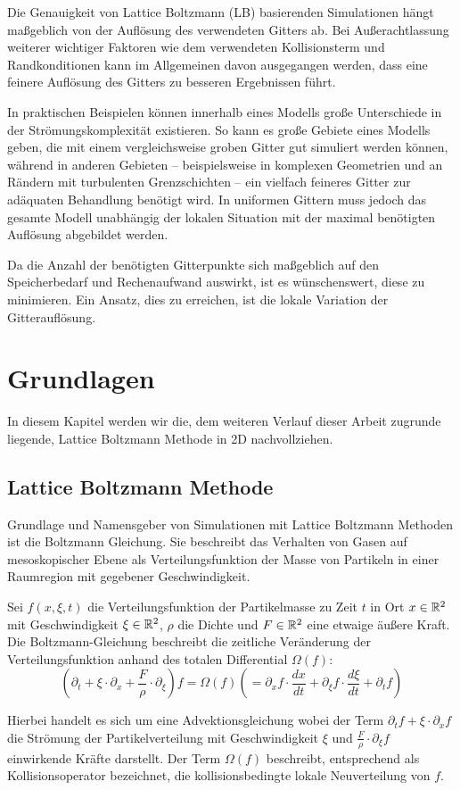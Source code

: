 Die Genauigkeit von Lattice Boltzmann (LB) basierenden Simulationen hängt maßgeblich von der Auflösung des verwendeten Gitters ab. Bei Außerachtlassung weiterer wichtiger Faktoren wie dem verwendeten Kollisionsterm und Randkonditionen kann im Allgemeinen davon ausgegangen werden, dass eine feinere Auflösung des Gitters zu besseren Ergebnissen führt.

In praktischen Beispielen können innerhalb eines Modells große Unterschiede in der Strömungskomplexität existieren. So kann es große Gebiete eines Modells geben, die mit einem vergleichsweise groben Gitter gut simuliert werden können, während in anderen Gebieten -- beispielsweise in komplexen Geometrien und an Rändern mit turbulenten Grenzschichten -- ein vielfach feineres Gitter zur adäquaten Behandlung benötigt wird. In uniformen Gittern muss jedoch das gesamte Modell unabhängig der lokalen Situation mit der maximal benötigten Auflösung abgebildet werden.

Da die Anzahl der benötigten Gitterpunkte sich maßgeblich auf den Speicherbedarf und Rechenaufwand auswirkt, ist es wünschenswert, diese zu minimieren. Ein Ansatz, dies zu erreichen, ist die lokale Variation der Gitterauflösung.

\newpage
\section{Grundlagen}

In diesem Kapitel werden wir die, dem weiteren Verlauf dieser Arbeit zugrunde liegende, Lattice Boltzmann Methode in 2D nachvollziehen.

\subsection{Lattice Boltzmann Methode}\label{kap:LBM}

Grundlage und Namensgeber von Simulationen mit Lattice Boltzmann Methoden ist die Boltzmann Gleichung. Sie beschreibt das Verhalten von Gasen auf mesoskopischer Ebene als Verteilungsfunktion der Masse von Partikeln in einer Raumregion mit gegebener Geschwindigkeit.

\begin{Definition}
Sei \(f(x,\xi,t)\) die Verteilungsfunktion der Partikelmasse zu Zeit \(t\) in Ort \(x \in \mathbb{R}^2\) mit Geschwindigkeit \(\xi \in \mathbb{R}^2\), \(\rho\) die Dichte und \(F \in \mathbb{R}^2\) eine etwaige äußere Kraft. Die Boltzmann-Gleichung beschreibt die zeitliche Veränderung der Verteilungsfunktion anhand des totalen Differential \(\Omega(f)\):
\[ \left( \partial_t + \xi \cdot \partial_x + \frac{F}{\rho} \cdot \partial_\xi \right) f = \Omega(f) \left( = \partial_x f \cdot \frac{dx}{dt} + \partial_\xi f \cdot \frac{d\xi}{dt} + \partial_t f \right) \]

Hierbei handelt es sich um eine Advektionsgleichung wobei der Term \(\partial_t f + \xi \cdot \partial_x f\) die Strömung der Partikelverteilung mit Geschwindigkeit \(\xi\) und \(\frac{F}{\rho} \cdot \partial_\xi f\) einwirkende Kräfte darstellt. Der Term \(\Omega(f)\) beschreibt, entsprechend als Kollisionsoperator bezeichnet, die kollisionsbedingte lokale Neuverteilung von \(f\).
\end{Definition}

